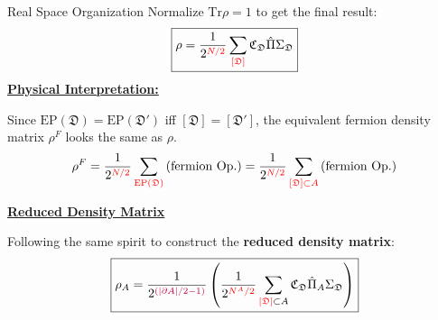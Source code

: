 \documentclass[professionalfont,
                xcolor=dvipsnames]{beamer}
\newcommand{\anglelr}[1]{\left\langle #1 \right\rangle}
\newcommand{\abs}[1]{\left| #1 \right|}
\newcommand{\de}{\partial}
\newcommand{\lr}[1]{\left(#1\right)}
\newcommand{\mrm}[1]{\mathrm{#1}}
\newcommand{\tr}{\mrm{Tr}}
\begin{document}
\begin{frame}{Real Space Organization}
    Normalize $\tr \rho = 1$ to get the final result:
    \[
    \boxed{
        \rho = \frac{1}{2^{\color{red} N/2}} \sum_{\color{red} [\mathfrak{D}]} \mathfrak{C}_\mathfrak{D} \hat{\Pi}\Sigma_{\mathfrak{D}}
    }
    \]
    \textbf{\underline{Physical Interpretation:}}
    
    Since $\mrm{EP(\mathfrak{D})} = \mrm{EP}(\mathfrak{D}')$ iff $[\mathfrak{D}] = [\mathfrak{D}']$, the equivalent fermion density matrix $\rho^F$ looks the same as $\rho$. 
    \[
    \rho^F = \frac{1}{2^{\color{red} N/2}}\sum_{ \color{red} \mrm{EP}(\mathfrak{D})}\lr{\text{fermion Op.}} 
    = 
    \frac{1}{2^{\color{red} N/2}}\sum_{\color{red} [\mathfrak{D}]\subset A}\lr{\text{fermion Op.}}
    \]

    \textbf{\underline{Reduced Density Matrix}}

    Following the same spirit to construct the \textbf{reduced density matrix}: 
        \[
        \boxed{
            \rho_A 
            = 
            \frac{1}{2^{ {\color{purple}\lr{\abs{\de A}/2 - 1}}}} 
            \lr{
                \frac{1}{2^{\color{red} N^A/2}} 
                \sum_{{\color{red} [\mathfrak{D}]} \subset A}
                \mathfrak{C}_\mathfrak{D} \hat{\Pi}_A
                \Sigma_{\mathfrak{D}}
            }
        }
        \]
\end{frame}
\end{document}
